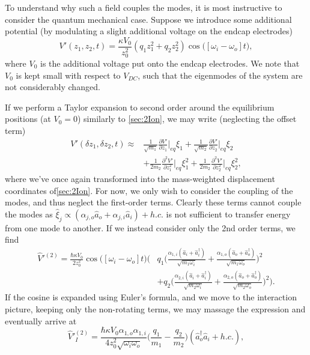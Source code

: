 To understand why such a field couples the modes, it is most instructive to consider the quantum mechanical case. Suppose we introduce some additional potential (by modulating a slight additional voltage on the endcap electrodes)
\begin{equation}
    V'(z_1,z_2,t) = \frac{\kappa V_0}{z_0^2}(q_1z_1^2+q_2z_2^2)\cos{\big([\omega_i-\omega_o]t\big)}\label{eq:couplingPot},
\end{equation}
where $V_0$ is the additional voltage put onto the endcap electrodes. We note that $V_0$ is kept small with respect to $V_{DC}$, such that the eigenmodes of the system are not considerably changed.

If we perform a Taylor expansion to second order around the equilibrium positions (at $V_0= 0$) similarly to \cref{sec:2Ion}, we may write (neglecting the offset term)
\begin{align}
    V'(\delta z_1,\delta z_2,t)\approx &\frac{1}{\sqrt{m_1}}\frac{\partial V'}{\partial z_1}\bigg\vert_{eq}\xi_1+\frac{1}{\sqrt{m_2}}\frac{\partial V'}{\partial z_2}\bigg\vert_{eq}\xi_2
    \\&+\frac{1}{2 m_2}\frac{\partial^2 V'}{\partial z_1^2}\bigg\vert_{eq}\xi_1^2\nonumber+\frac{1}{2m_2}\frac{\partial^2 V'}{\partial z_2^2}\bigg\vert_{eq}\xi_2^2,
\end{align}
where we've once again transformed into the mass-weighted displacement coordinates of\cref{sec:2Ion}.
For now, we only wish to consider the coupling of the modes, and thus neglect the first-order terms. Clearly these terms cannot couple the modes as $\hat{\xi}_j \propto (\alpha_{j,o}\hat{a}_o+\alpha_{j,i}\hat{a}_i)+h.c.$ is not sufficient to transfer energy from one mode to another. If we instead consider only the 2nd order terms, we find
\begin{align}
    \hat{V}'^{(2)} = \nonumber \frac{\hbar\kappa V_0}{2z_0^2}\cos{\big([\omega_i-\omega_o]t\big)}\bigg(&q_1\big(\frac{\alpha_{1,i}(\hat{a}_i+\hat{a}_i^\dagger)}{\sqrt{m_1\omega_i}}+\frac{\alpha_{1,o}(\hat{a}_o+\hat{a}_o^\dagger)}{\sqrt{m_1\omega_o}}\big)^2\\
    &+q_2\big(\frac{\alpha_{2,i}(\hat{a}_i+\hat{a}_i^\dagger)}{\sqrt{m_2\omega_i}}+\frac{\alpha_{2,o}(\hat{a}_o+\hat{a}_o^\dagger)}{\sqrt{m_2\omega_o}}\big)^2\bigg).
\end{align}
If the cosine is expanded using Euler's formula, and we move to the interaction picture, keeping only the non-rotating terms, we may massage the expression and eventually arrive at
\begin{equation}
    \hat{V}'^{(2)}_I = \frac{\hbar\kappa V_0\alpha_{1,o}\alpha_{1,i}}{4z_0^2\sqrt{\omega_i\omega_o}}\big(\frac{q_1}{m_1}-\frac{q_2}{m_2}\big)(\hat{a}_o^\dagger \hat{a}_i + h.c.),
\end{equation}
